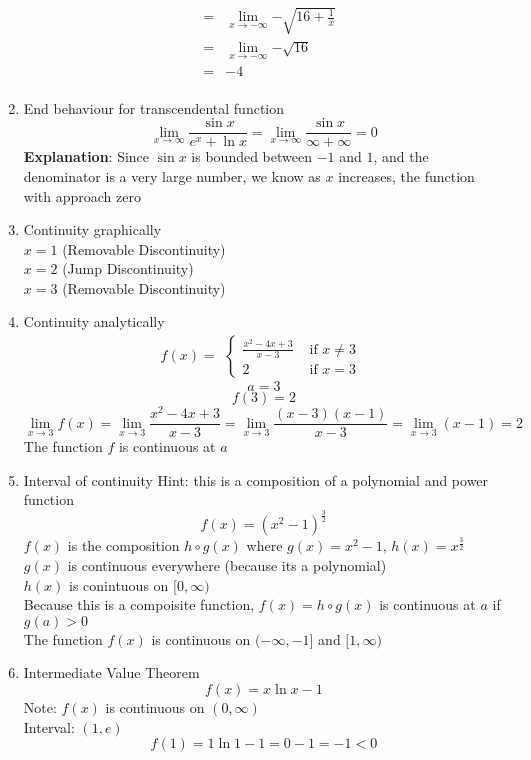 \documentclass{article}
\begin{document}
\begin{enumerate}
\begin{eqnarray}
			&=& \lim_{x \to - \infty}{- \sqrt{16 + \frac{1}{x}}} \\
			&=& \lim_{x \to - \infty}{- \sqrt{16}} \\
			&=& -4 \\
		\end{eqnarray}
	\item End behaviour for transcendental function
		$$\lim_{x \to \infty}{\frac{\sin{x}}{e^x + \ln{x}}} = \lim_{x \to \infty}{\frac{\sin{x}}{\infty + \infty}} = 0$$
		\textbf{Explanation}: Since $\sin{x}$ is bounded between $-1$ and $1$, and the denominator is a very large number, we know as $x$ increases, the function with approach zero
	\item Continuity graphically
		\\ $x = 1$ (Removable Discontinuity)
		\\ $x = 2$ (Jump Discontinuity)
		\\ $x = 3$ (Removable Discontinuity)
	\item Continuity analytically
		$$f(x) = \begin{aligned}
			\begin{cases}
				\frac{x^2 - 4x + 3}{x - 3} &\text{ if } x \neq 3 \\
				2 &\text{ if } x = 3
			\end{cases}
		\end{aligned}$$
		$$a = 3$$
		$$f(3) = 2$$
		$$\lim_{x \to 3}{f(x)} = \lim_{x \to 3}{\frac{x^2 - 4x + 3}{x - 3}} = \lim_{x \to 3}{\frac{(x - 3)(x - 1)}{x-3}} = \lim_{x \to 3}{(x - 1)} = 2$$
		The function $f$ is continuous at $a$
	\item Interval of continuity
		Hint: this is a composition of a polynomial and power function
		$$f(x) = (x^2 - 1)^{\frac{3}{2}}$$
		$f(x)$ is the composition $h \circ g(x)$ where $g(x) = x^2 - 1$, $h(x) = x^{\frac{3}{2}}$ \\
		$g(x)$ is continuous everywhere (because its a polynomial) \\
		$h(x)$ is conintuous on $[0, \infty)$ \\
		Because this is a compoisite function, $f(x) = h \circ g(x)$ is continuous at $a$ if $g(a) > 0$ \\
		The function $f(x)$ is continuous on $(- \infty, -1]$ and $[1, \infty)$
	\item Intermediate Value Theorem
		$$f(x) = x \ln{x} - 1$$
		Note: $f(x)$ is continuous on $(0, \infty)$ \\
		Interval: $(1, e)$ \\
		$$f(1) = 1 \ln{1} - 1 = 0 - 1 = -1 < 0$$

\end{enumerate}
\end{document}
